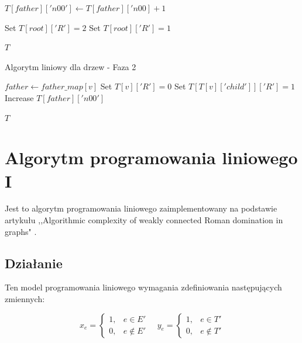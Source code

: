 \begin{algorithm}
\begin{algorithmic}[1]
                        \State $T[father]['n00'] \gets T[father]['n00] + 1$
                    \EndIf

                \EndIf
            \EndFor
    
                \State Set $T[root]['R'] = 2$
            \EndIf
                \State Set $T[root]['R'] = 1$
            \EndIf
    
            \State \Return $T$
        \EndFunction
    \end{algorithmic}
    \end{algorithm}
    
    \begin{algorithm}
    \caption*{Algorytm liniowy dla drzew - Faza 2}
    \begin{algorithmic}[1]
                \State $father \gets father\_map[v]$
                        \State Set $T[v]['R'] = 0$
                        \State Set $T[T[v]['child']]['R'] = 1$
                        \State Increase $T[father]['n00']$
                    \EndIf
                \EndIf
            \EndFor
    
            \State \Return $T$
        \EndFunction
    \end{algorithmic}
\end{algorithm}

\FloatBarrier
\section{Algorytm programowania liniowego I}
Jest to algorytm programowania liniowego zaimplementowany na podstawie artykułu ,,Algorithmic complexity of weakly connected Roman domination in graphs" \cite{ILP}.

\subsection{Działanie}

Ten model programowania liniowego wymagania zdefiniowania następujących zmiennych:

\[
x_e =
\begin{cases}
1, & e \in E' \\
0, & e \notin E'
\end{cases}
\quad
y_e =
\begin{cases}
1, & e \in T' \\
0, & e \notin T'
\end{cases}
\]

